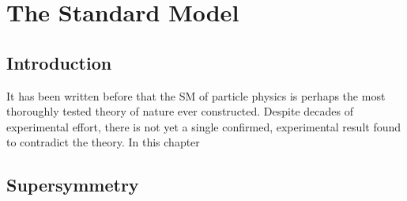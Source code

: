 
\chapter{The Standard Model}
\section{Introduction}
It has been written before that the \acl{SM} of particle physics is perhaps the
most thoroughly tested theory of nature ever constructed. Despite decades of
experimental effort, there is not yet a single confirmed, experimental result
found to contradict the theory. In this chapter

\section{Supersymmetry}
\label{sec:susy}